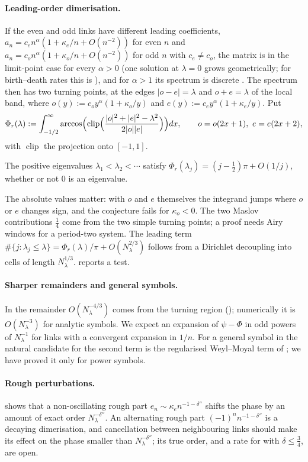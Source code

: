 \paragraph{Leading-order dimerisation.} If the even and odd links have different
leading coefficients, $a_n=c_en^\alpha(1+\kappa_e/n+O(n^{-2}))$ for even $n$ and
$a_n=c_on^\alpha(1+\kappa_o/n+O(n^{-2}))$ for odd $n$ with $c_e\ne c_o$, the matrix is in the
limit-point case for every $\alpha>0$ (one solution at $\lambda=0$ grows geometrically; for
birth--death rates this is \cite[\S2, Remark~3]{Valent1999}), and for $\alpha>1$ its spectrum is
discrete \cite[Thm.~A]{SwiderskiTrojan2022}. The spectrum then has two turning points, at the
edges $|o-e|=\lambda$ and $o+e=\lambda$ of the local band, where $o(y):=c_oy^\alpha(1+\kappa_o/y)$ and
$e(y):=c_ey^\alpha(1+\kappa_e/y)$. Put
\[
  \Phi_r(\lambda):=\int_{-1/2}^\infty\arccos\Bigl(\operatorname{clip}\Bigl(\frac{|o|^2+|e|^2-\lambda^2}{2|o||e|}\Bigr)\Bigr)dx,
  \qquad o=o(2x+1),\ e=e(2x+2),
\]
with $\operatorname{clip}$ the projection onto $[-1,1]$.
\begin{conjecture}\label{conj:H}
The positive eigenvalues $\lambda_1<\lambda_2<\cdots$ satisfy $\Phi_r(\lambda_j)=(j-\frac12)\pi+O(1/j)$, whether
or not $0$ is an eigenvalue.
\end{conjecture}
\noindent The absolute values matter: with $o$ and $e$ themselves the integrand jumps where
$o$ or $e$ changes sign, and the conjecture fails for $\kappa_o<0$. The two Maslov
contributions $\frac14$ come from the two simple turning points; a proof needs Airy windows for
a period-two system. The leading term $\#\{j:\lambda_j\le\lambda\}=\Phi_r(\lambda)/\pi+O(N_\lambda^{2/3})$ follows from
a Dirichlet decoupling into cells of length $N_\lambda^{1/3}$.  reports a test.

\paragraph{Sharper remainders and general symbols.} In  the
remainder $O(N_\lambda^{-4/3})$ comes from the turning region (); numerically it is
$O(N_\lambda^{-3})$ for analytic symbols. We expect an expansion of $\psi-\Phi$ in odd powers of
$N_\lambda^{-1}$ for links with a convergent expansion in $1/n$. For a general symbol in
 the natural candidate for the second term is the regularised Weyl--Moyal term of
; we have proved it only for power symbols.

\paragraph{Rough perturbations.}  shows that a non-oscillating rough part
$e_n\sim\kappa_en^{-1-\delta''}$ shifts the phase by an amount of exact order $N_\lambda^{-\delta''}$. An
alternating rough part $(-1)^nn^{-1-\delta''}$ is a decaying dimerisation, and cancellation between
neighbouring links should make its effect on the phase smaller than $N_\lambda^{-\delta''}$; its true order, and a rate for
 with $\delta\le\frac34$, are open.

